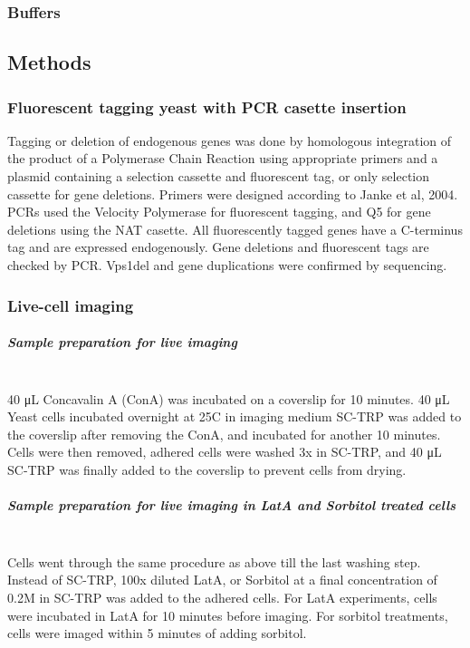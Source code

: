 \subsubsection{Buffers}

\subsection{Methods}
\subsubsection{Fluorescent tagging yeast with PCR casette insertion}
Tagging or deletion of endogenous genes was done by homologous integration of the product of a Polymerase Chain Reaction using appropriate primers and a plasmid containing a selection cassette and fluorescent tag, or only selection cassette for gene deletions. Primers were designed according to Janke et al, 2004. PCRs used the Velocity Polymerase for fluorescent tagging, and Q5 for gene deletions using the NAT casette. 
All fluorescently tagged genes have a C-terminus tag and are expressed endogenously.
Gene deletions and fluorescent tags are checked by PCR. Vps1del and gene duplications were confirmed by sequencing. 

\subsubsection{Live-cell imaging}
\subparagraph{Sample preparation for live imaging}
			\mbox{}\\
40 μL Concavalin A (ConA) was incubated on a coverslip for 10 minutes. 40 μL Yeast cells incubated overnight at 25C in imaging medium SC-TRP was added to the coverslip after removing the ConA, and incubated for another 10 minutes. Cells were then removed, adhered cells were washed 3x in SC-TRP, and 40 μL SC-TRP was finally added to the coverslip to prevent cells from drying. 

\subparagraph{Sample preparation for live imaging in LatA and Sorbitol treated cells}
\mbox{}\\
Cells went through the same procedure as above till the last washing step. Instead of SC-TRP, 100x diluted LatA, or Sorbitol at a final concentration of 0.2M in SC-TRP was added to the adhered cells. For LatA experiments, cells were incubated in LatA for 10 minutes before imaging. For sorbitol treatments, cells were imaged within 5 minutes of adding sorbitol.

